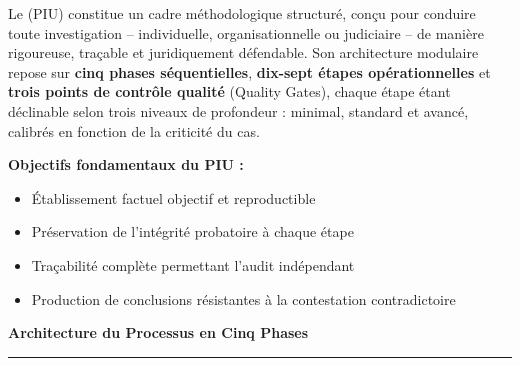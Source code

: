\documentclass[12pt, a4paper]{report}
\begin{document}
	
	
	
	\thispagestyle{plain}
	\vspace*{0.2cm}
	
	
	
	\vspace{0.35cm}
	
	\noindent
	Le  (PIU) constitue un cadre
	méthodologique structuré, conçu pour conduire toute investigation --
	individuelle, organisationnelle ou judiciaire -- de manière rigoureuse,
	traçable et juridiquement défendable. Son architecture modulaire repose
	sur \textbf{cinq phases séquentielles}, \textbf{dix-sept étapes opérationnelles}
	et \textbf{trois points de contrôle qualité} (Quality Gates), chaque étape
	étant déclinable selon trois niveaux de profondeur : minimal, standard
	et avancé, calibrés en fonction de la criticité du cas.
	
	\vspace{0.4cm}
	
	\begin{boxobjectifs}
		\textbf{Objectifs fondamentaux du PIU :}
		\begin{itemize}
			\item Établissement factuel objectif et reproductible
			\item Préservation de l'intégrité probatoire à chaque étape
			\item Traçabilité complète permettant l'audit indépendant
			\item Production de conclusions résistantes à la contestation contradictoire
		\end{itemize}
	\end{boxobjectifs}
	
	\vspace{0.35cm}
	
	{\color{CP}\large\sffamily\bfseries\faAngleDoubleRight\enspace
		Architecture du Processus en Cinq Phases}
	\vspace{0.15cm}
	\color{CV}\rule{\linewidth}{0.8pt}
	\color{CT}
	
\end{document}
